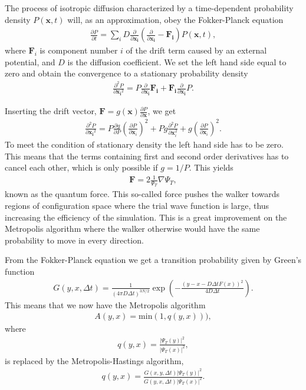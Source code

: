 			The process of isotropic diffusion characterized by a time-dependent
			probability density $P\left(\mathbf{x},t\right)$ will, as an approximation,
			obey the Fokker-Planck equation
			\begin{align}
				\frac{\partial P}{\partial t}=\sum_{i}D\frac{\partial}{\partial\mathbf{x_{i}}}\left(\frac{\partial}{\partial\mathbf{x_{i}}}-\mathbf{F_{i}}\right)P(\mathbf{x},t),
			\end{align}
			where $\mathbf{F}_{i}$ is component number $i$ of the drift term
			caused by an external potential, and $D$ is the diffusion coefficient.
			We set the left hand side equal to zero and obtain the convergence
			to a stationary probability density
			\begin{align}
				\frac{\partial^{2}P}{\partial{\mathbf{x_{i}}^{2}}}=P\frac{\partial}{\partial{\mathbf{x_{i}}}}\mathbf{F_{i}}+\mathbf{F_{i}}\frac{\partial}{\partial{\mathbf{x_{i}}}}P.
			\end{align}


			Inserting the drift vector, $\mathbf{F}=g(\mathbf{x})\frac{\partial P}{\partial\mathbf{x}}$,
			we get
			\begin{align}
				\frac{\partial^{2}P}{\partial{\mathbf{x_{i}}^{2}}}=P\frac{\partial g}{\partial P}\left(\frac{\partial P}{\partial{\mathbf{x}_{i}}}\right)^{2}+Pg\frac{\partial^{2}P}{\partial{\mathbf{x}_{i}^{2}}}+g\left(\frac{\partial P}{\partial{\mathbf{x}_{i}}}\right)^{2}.
			\end{align}
			To meet the condition of stationary density the left hand side has
			to be zero. This means that the terms containing first and second
			order derivatives has to cancel each other, which is only possible
			if $g=1/P$. This yields
			\begin{align}
				\mathbf{F}=2\frac{1}{\Psi_{T}}\nabla\Psi_{T},
			\end{align}
			known as the quantum force. This so-called force pushes the walker
			towards regions of configuration space where the trial wave function
			is large, thus increasing the efficiency of the simulation. This is
			a great improvement on the Metropolis algorithm where the walker otherwise would have
			the same probability to move in every direction.

			From the Fokker-Planck equation we get a transition probability given
			by Green's function
			\begin{align}
				G(y,x,\Delta t)=\frac{1}{(4\pi D\Delta t)^{3N/2}}\exp\left(-\frac{(y-x-D\Delta tF(x))^{2}}{4D\Delta t}\right).
			\end{align}
			This means that we now have the Metropolis algorithm
			\begin{align}
				A(y,x)=\mathrm{min}(1,q(y,x))),
			\end{align}
			where
			\begin{align}
				q(y,x)=\frac{|\Psi_{T}(y)|^{2}}{|\Psi_{T}(x)|^{2}},
			\end{align}
			is replaced by the Metropolis-Hastings algorithm,
			\begin{align}
				q(y,x)=\frac{G(x,y,\Delta t)|\Psi_{T}(y)|^{2}}{G(y,x,\Delta t)|\Psi_{T}(x)|^{2}}.
			\end{align}
